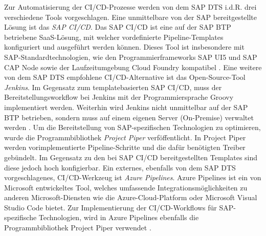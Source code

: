Zur Automatisierung der CI/CD-Prozesse werden von dem SAP DTS i.d.R. drei verschiedene Tools vorgeschlagen. Eine unmittelbare von der SAP bereitgestellte Lösung ist das \textit{\ac{SAP CI/CD}}. Das SAP CI/CD ist eine auf der SAP BTP betriebene SaaS-Lösung, mit welcher vordefinierte Pipeline-Templates konfiguriert und ausgeführt werden können. Dieses Tool ist insbesondere mit SAP-Standardtechnologien, wie den Programmierframeworks SAP UI5 und SAP CAP Node sowie der Laufzeitumgebung Cloud Foundry kompatibel \cite{.20230405}. Eine weitere von dem SAP DTS empfohlene CI/CD-Alternative ist das Open-Source-Tool \textit{Jenkins}. Im Gegensatz zum templatebasierten SAP CI/CD, muss der Bereitstellungsworkflow bei Jenkins mit der Programmiersprache Groovy implementiert werden. Weiterhin wird Jenkins nicht unmittelbar auf der SAP BTP betrieben, sondern muss auf einem eigenen Server (On-Premise) verwaltet werden \cite[266]{Belmont.2018}. Um die Bereitstellung von SAP-spezifischen Technologien zu optimieren, wurde die Programmbibliothek \textit{Project Piper} verföffentlicht. In Project Piper werden vorimplementierte Pipeline-Schritte und die dafür benötigten Treiber gebündelt. Im Gegensatz zu den bei SAP CI/CD bereitgestellten Templates sind diese jedoch hoch konfigierbar.
Ein externes, ebenfalls von dem SAP DTS vorgeschlagenes, CI/CD-Werkzeug ist \textit{Azure Pipelines}. Azure Pipelines ist ein von Microsoft entwickeltes Tool, welches umfassende Integrationsmöglichkeiten zu anderen Microsoft-Diensten wie die Azure-Cloud-Platform oder Microsoft Visual Studio Code bietet. Zur Implementierung der CI/CD-Workflows für SAP-spezifische Technologien, wird in Azure Pipelines ebenfalls die Programmbibliothek Project Piper verwendet \cite{Naveen.20230224}.
